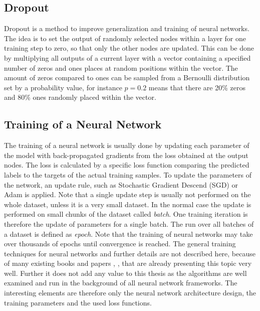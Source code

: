 
\subsection{Dropout}
Dropout \cite{Hinton2012} is a method to improve generalization and training of neural networks.
The idea is to set the output of randomly selected nodes within a layer for one training step to zero, so that only the other nodes are updated.
This can be done by multiplying all outputs of a current layer with a vector containing a specified number of zeros and ones places at random positions within the vector.
The amount of zeros compared to ones can be sampled from a Bernoulli distribution set by a probability value, for instance $p=0.2$ means that there are 20\% zeros and 80\% ones randomly placed within the vector.



\subsection{Training of a Neural Network}
The training of a neural network is usually done by updating each parameter of the model with back-propagated gradients from the loss obtained at the output nodes.
The loss is calculated by a specific loss function comparing the predicted labels to the targets of the actual training samples.
To update the parameters of the network, an update rule, such as Stochastic Gradient Descend (SGD) or Adam \cite{Kingma2015} is applied.
Note that a single update step is usually not performed on the whole dataset, unless it is a very small dataset. 
In the normal case the update is performed on small chunks of the dataset called \emph{batch}.
One training iteration is therefore the update of parameters for a single batch.
The run over all batches of a dataset is defined as \emph{epoch}.
Note that the training of neural networks may take over thousands of epochs until convergence is reached.
The general training techniques for neural networks and further details are not described here, because of many existing books and papers \cite{LeCun2006}, \cite{Goodfellow2016}, \cite{DeepLearning} that are already presenting this topic very well. 
Further it does not add any value to this thesis as the algorithms are well examined and run in the background of all neural network frameworks.
The interesting elements are therefore only the neural network architecture design, the training parameters and the used loss functions.